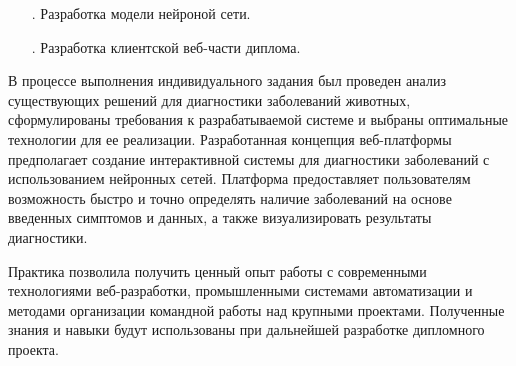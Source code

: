{\begin{itemize}[leftmargin=2.15cm, labelwidth=0.65cm, labelsep=0.0cm]
\item[\theitemcntr.] Разработка модели нейроной сети.
\addtocounter{itemcntr}{1}

\item[\theitemcntr.] Разработка клиентской веб-части диплома.
\addtocounter{itemcntr}{1}

\setcounter{itemcntr}{1}
\end{itemize}

\par \redline В процессе выполнения индивидуального задания был проведен анализ существующих решений для диагностики заболеваний животных, сформулированы требования к разрабатываемой системе и выбраны оптимальные технологии для ее реализации. Разработанная концепция веб-платформы предполагает создание интерактивной системы для диагностики заболеваний с использованием нейронных сетей. Платформа предоставляет пользователям возможность быстро и точно определять наличие заболеваний на основе введенных симптомов и данных, а также визуализировать результаты диагностики.

\par \redline Практика позволила получить ценный опыт работы с современными технологиями веб-разработки, промышленными системами автоматизации и методами организации командной работы над крупными проектами. Полученные знания и навыки будут использованы при дальнейшей разработке дипломного проекта.

}